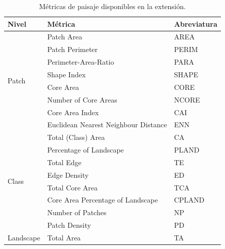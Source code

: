 \begin{table}[]
\centering
\caption{Métricas de paisaje disponibles en la extensión.}
\label{tab:listmetricas}
\begin{tabular}{lll}
\hline
\textbf{Nivel}             & \textbf{Métrica}                     & \textbf{Abreviatura} \\ \hline
\multirow{8}{*}{Patch}     & Patch Area                           & AREA                 \\
                           & Patch Perimeter                      & PERIM                \\
                           & Perimeter-Area-Ratio                 & PARA                 \\
                           & Shape Index                          & SHAPE                \\
                           & Core Area                            & CORE                 \\
                           & Number of Core Areas                 & NCORE                \\
                           & Core Area Index                      & CAI                  \\
                           & Euclidean Nearest Neighbour Distance & ENN                  \\ \hline
\multirow{8}{*}{Class}     & Total (Class) Area                   & CA                   \\
                           & Percentage of Landscape              & PLAND                \\
                           & Total Edge                           & TE                   \\
                           & Edge Density                         & ED                   \\
                           & Total Core Area                      & TCA                  \\
                           & Core Area Percentage of Landscape    & CPLAND               \\
                           & Number of Patches                    & NP                   \\
                           & Patch Density                        & PD                   \\ \hline
\multirow{9}{*}{Landscape} & Total Area                           & TA                   \\

\end{tabular}
\end{table}
